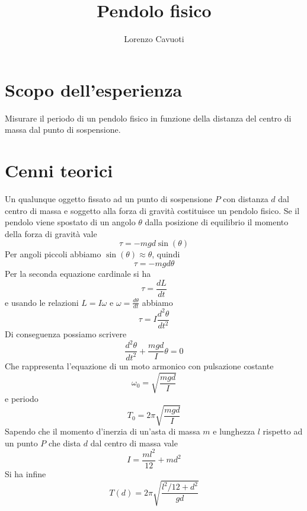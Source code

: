 \documentclass{article}
\title{Pendolo fisico}
\author{Lorenzo Cavuoti}
\begin{document}
	\maketitle
	
	\section{Scopo dell'esperienza}
		Misurare il periodo di un pendolo fisico in funzione della distanza del centro di massa dal punto di sospensione.
		
	\section{Cenni teorici}
		Un qualunque oggetto fissato ad un punto di sospensione $P$ con distanza $d$ dal centro di massa e soggetto alla forza di gravit\`{a} costituisce un pendolo fisico. Se il pendolo viene spostato di un angolo $\theta$ dalla posizione di equilibrio il momento della forza di gravit\`{a} vale
		\begin{equation}
			\tau = -mgd\sin(\theta)
		\end{equation}
		Per angoli piccoli abbiamo $\sin(\theta) \approx \theta$, quindi
		\begin{equation*}
			\tau = -mgd\theta
		\end{equation*}
		Per la seconda equazione cardinale si ha
		\begin{equation}
			\tau = \frac{dL}{dt}
		\end{equation}
		e usando le relazioni $L = I\omega$ e $\omega = \frac{d\theta}{dt}$ abbiamo
		\begin{equation*}
			\tau = I\frac{d^2\theta}{dt^2}
		\end{equation*}
		Di conseguenza possiamo scrivere
		\begin{equation}
			\frac{d^2\theta}{dt^2} + \frac{mgd}{I}\theta = 0
		\end{equation}
		Che rappresenta l'equazione di un moto armonico con pulsazione costante
		\begin{equation*}
			\omega_0 = \sqrt{\frac{mgd}{I}}
		\end{equation*}
		e periodo
		\begin{equation*}
			T_0 = 2\pi\sqrt{\frac{mgd}{I}}
		\end{equation*}
		Sapendo che il momento d'inerzia di un'asta di massa $m$ e lunghezza $l$ rispetto ad un punto $P$ che dista $d$ dal centro di massa vale
		\begin{equation*}
			I = \frac{ml^2}{12}+md^2
		\end{equation*}
		Si ha infine
		\begin{equation}
			T(d) = 2\pi\sqrt{\frac{l^2/12+d^2}{gd}}
			\label{Periodo pendolo fisico}
		\end{equation}
		
\end{document}
